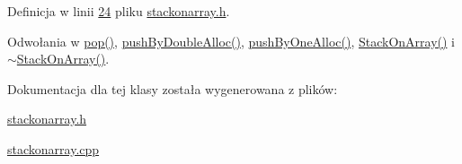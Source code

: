 Definicja w linii \hyperlink{stackonarray_8h_source_l00024}{24} pliku \hyperlink{stackonarray_8h_source}{stackonarray.\-h}.



Odwołania w \hyperlink{stackonarray_8cpp_source_l00064}{pop()}, \hyperlink{stackonarray_8cpp_source_l00041}{push\-By\-Double\-Alloc()}, \hyperlink{stackonarray_8cpp_source_l00019}{push\-By\-One\-Alloc()}, \hyperlink{stackonarray_8cpp_source_l00011}{Stack\-On\-Array()} i \hyperlink{stackonarray_8cpp_source_l00069}{$\sim$\-Stack\-On\-Array()}.



Dokumentacja dla tej klasy została wygenerowana z plików\-:\begin{DoxyCompactItemize}
\item 
\hyperlink{stackonarray_8h}{stackonarray.\-h}\item 
\hyperlink{stackonarray_8cpp}{stackonarray.\-cpp}\end{DoxyCompactItemize}
